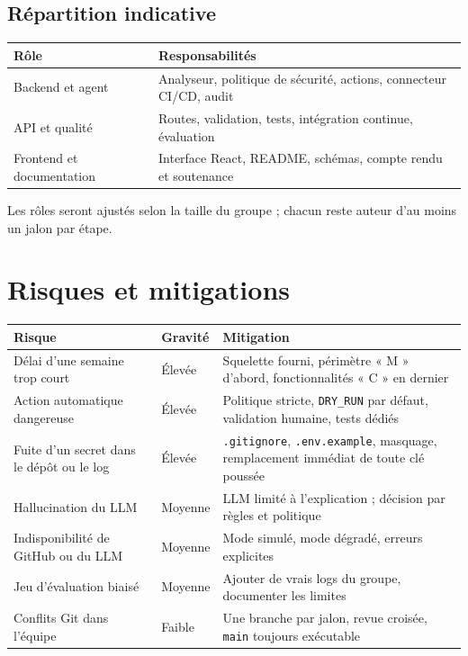 \documentclass[11pt,a4paper]{article}
\newcommand{\code}[1]{\texttt{#1}}
\begin{document}
\subsection{Répartition indicative}
\begin{longtable}{p{3.5cm}p{11cm}}
\toprule
\textbf{Rôle} & \textbf{Responsabilités} \\
\midrule\endhead
Backend et agent & Analyseur, politique de sécurité, actions, connecteur CI/CD, audit \\
API et qualité & Routes, validation, tests, intégration continue, évaluation \\
Frontend et documentation & Interface React, README, schémas, compte rendu et soutenance \\
\bottomrule
\end{longtable}
Les rôles seront ajustés selon la taille du groupe ; chacun reste auteur d'au moins un jalon par étape.

\section{Risques et mitigations}
\begin{longtable}{p{4.2cm}p{1.8cm}p{8.5cm}}
\toprule
\textbf{Risque} & \textbf{Gravité} & \textbf{Mitigation} \\
\midrule\endhead
Délai d'une semaine trop court & Élevée & Squelette fourni, périmètre « M » d'abord, fonctionnalités « C » en dernier \\
Action automatique dangereuse & Élevée & Politique stricte, \code{DRY\_RUN} par défaut, validation humaine, tests dédiés \\
Fuite d'un secret dans le dépôt ou le log & Élevée & \code{.gitignore}, \code{.env.example}, masquage, remplacement immédiat de toute clé poussée \\
Hallucination du LLM & Moyenne & LLM limité à l'explication ; décision par règles et politique \\
Indisponibilité de GitHub ou du LLM & Moyenne & Mode simulé, mode dégradé, erreurs explicites \\
Jeu d'évaluation biaisé & Moyenne & Ajouter de vrais logs du groupe, documenter les limites \\
Conflits Git dans l'équipe & Faible & Une branche par jalon, revue croisée, \code{main} toujours exécutable \\
\bottomrule
\end{longtable}
\end{document}
